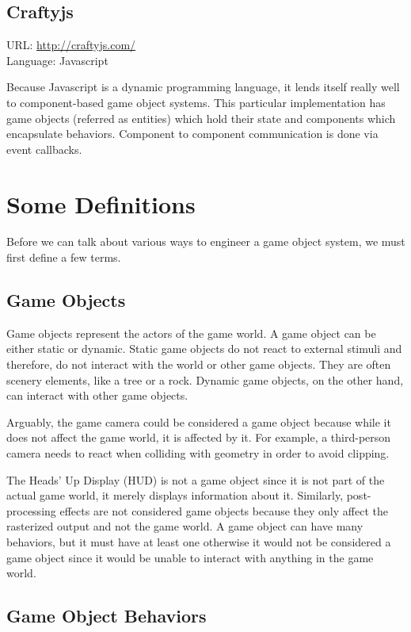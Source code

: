\documentclass[
    phd,
    electronic,
    letterpaper,
    simplechapterheading,
    openany,
    parttop,
    lof,
]{byumsphd}
\begin{document}
\section{Craftyjs}

URL: \url{http://craftyjs.com/} \\
Language: Javascript

Because Javascript is a dynamic programming language, it lends itself really well to component-based game object systems. This particular implementation has game objects (referred as entities) which hold their state and components which encapsulate behaviors. Component to component communication is done via event callbacks.


\chapter{Some Definitions}

Before we can talk about various ways to engineer a game object system, we must first define a few terms.


\section{Game Objects}

Game objects represent the actors of the game world. A game object can be either static or dynamic. Static game objects do not react to external stimuli and therefore, do not interact with the world or other game objects. They are often scenery elements, like a tree or a rock. Dynamic game objects, on the other hand, can interact with other game objects.

Arguably, the game camera could be considered a game object because while it does not affect the game world, it is affected by it. For example, a third-person camera needs to react when colliding with geometry in order to avoid clipping.

The Heads' Up Display (HUD) is not a game object since it is not part of the actual game world, it merely displays information about it. Similarly, post-processing effects are not considered game objects because they only affect the rasterized output and not the game world. A game object can have many behaviors, but it must have at least one otherwise it would not be considered a game object since it would be unable to interact with anything in the game world.


\section{Game Object Behaviors}
\end{document}
